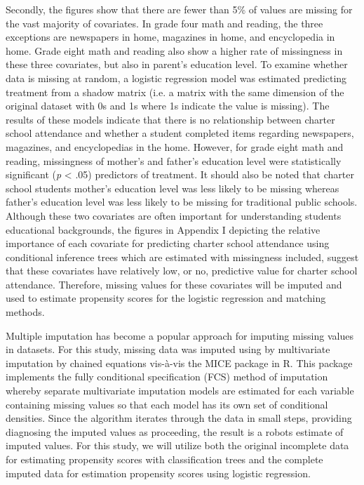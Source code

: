 \documentclass[letterpaper,12p,twoside]{article} %
\begin{document}
Secondly, the figures show that there are fewer than 5\% of values are missing for the vast majority of covariates. In grade four math and reading, the three exceptions are newspapers in home, magazines in home, and encyclopedia in home. Grade eight math and reading also show a higher rate of missingness in these three covariates, but also in parent's education level. To examine whether data is missing at random, a logistic regression model was estimated predicting treatment from a shadow matrix (i.e. a matrix with the same dimension of the original dataset with 0s and 1s where 1s indicate the value is missing). The results of these models indicate that there is no relationship between charter school attendance and whether a student completed items regarding newspapers, magazines, and encyclopedias in the home. However, for grade eight math and reading, missingness of mother's and father's education level were statistically significant (\textit{p} < .05) predictors of treatment. It should also be noted that charter school students mother's education level was less likely to be missing whereas father's education level was less likely to be missing for traditional public schools. Although these two covariates are often important for understanding students educational backgrounds, the figures in Appendix I depicting the relative importance of each covariate for predicting charter school attendance using conditional inference trees which are estimated with missingness included, suggest that these covariates have relatively low, or no, predictive value for charter school attendance. Therefore, missing values for these covariates will be imputed and used to estimate propensity scores for the logistic regression and matching methods. 

Multiple imputation \cite{rubin1987,Rubin1996mi} has become a popular approach for imputing missing values in datasets. For this study, missing data was imputed using  by multivariate imputation by chained equations vis-\`a-vis the MICE package  in R. This package implements the fully conditional specification (FCS) method of imputation whereby separate multivariate imputation models are estimated for each variable containing missing values so that each model has its own set of conditional densities. Since the algorithm iterates through the data in small steps, providing diagnosing the imputed values as proceeding, the result is a robots estimate of imputed values. For this study, we will utilize both the original incomplete data for estimating propensity scores with classification trees and the complete imputed data for estimation propensity scores using logistic regression.
\end{document}
